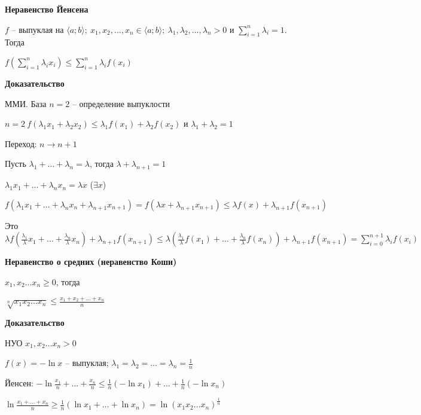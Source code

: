 \documentclass[14pt, letter paper]{article}
\newcommand{\q}[1]{\langle #1 \rangle}
\begin{document}
\textbf{Неравенство Йенсена}

$f$ -- выпуклая на $\q{a; b};\ x_1, x_2, \ldots, x_n \in \q{a; b};\ \lambda_1, \lambda_2, \ldots, \lambda_n > 0$ и $\sum\limits_{i = 1}^n \lambda_i = 1$. Тогда

$f(\sum\limits_{i = 1}^n \lambda_i x_i) \leq \sum\limits_{i = 1}^n \lambda_i f(x_i)$

\begin{center}
    \textbf{Доказательство}
\end{center}

ММИ. База $n = 2$ -- определение выпуклости

$n = 2\ f(\lambda_1 x_1 + \lambda_2 x_2) \leq \lambda_1 f(x_1) + \lambda_2 f(x_2)$ и $\lambda_1 + \lambda_2 = 1$

Переход: $n \rightarrow n + 1$

Пусть $\lambda_1 + \ldots + \lambda_n = \lambda$, тогда $\lambda + \lambda_{n + 1} = 1$

$\lambda_1x_1 + \ldots + \lambda_n x_n = \lambda x$ ($\exists x$)

$f(\lambda_1x_1 + \ldots + \lambda_n x_n + \lambda_{n + 1} x_{n + 1}) = f(\lambda x + \lambda_{n + 1}x_{n + 1}) \leq \lambda f(x) + \lambda_{n + 1} f(x_{n + 1})$

Это $\lambda f(\frac{\lambda_1}{\lambda}x_1 + \ldots + \frac{\lambda_n}{\lambda} x_n) + \lambda_{n + 1} f(x_{n + 1}) \leq \lambda (\frac{\lambda_1}{\lambda} f(x_1) + \ldots + \frac{\lambda_n}{\lambda}f(x_n)) + \lambda_{n + 1} f(x_{n + 1}) = \sum\limits_{i = 0}^{n + 1} \lambda_i f(x_i)$

\vspace{5mm}

\textbf{Неравенство о средних (неравенство Коши)}

$x_1, x_2 \ldots x_n \geq 0$, тогда

$\sqrt[n]{x_1 x_2 \ldots x_n} \leq \frac{x_1 + x_2 + \ldots + x_n}{n}$

\begin{center}
    \textbf{Доказательство}
\end{center}

НУО $x_1, x_2 \ldots x_n > 0$

$f(x) = -\ln{x}$ -- выпуклая; $\lambda_1 = \lambda_2 = \ldots = \lambda_n = \frac{1}{n}$

Йенсен: $-\ln{\frac{x_1}{n} + \ldots + \frac{x_n}{n}} \leq \frac{1}{n}(-\ln{x_1}) + \ldots + \frac{1}{n}(-\ln{x_n})$

$\ln{\frac{x_1 + \ldots + x_n}{n}} \geq \frac{1}{n}(\ln{x_1} + \ldots + \ln{x_n}) = \ln{(x_1x_2\ldots x_n)^\frac{1}{n}}$
\end{document}

